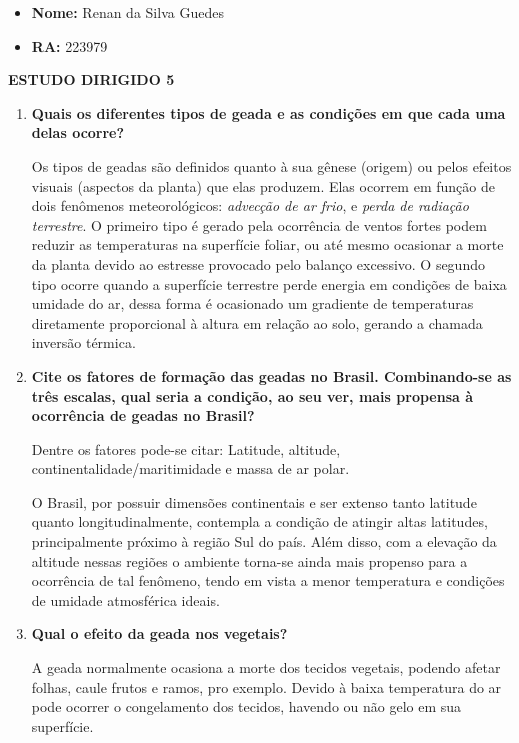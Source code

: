 \documentclass[a4paper, 12pt]{article}
\begin{document}
	\begin{itemize}
		\item\textbf{Nome:} Renan da Silva Guedes
		\item\textbf{RA:} 223979
	\end{itemize}

	\begin{center}
		\begin{large}
			\uppercase{\textbf{Estudo Dirigido 5}}
		\end{large}
	\end{center}

	\begin{enumerate}
		\item\textbf{Quais os diferentes tipos de geada e as condições em que cada uma delas ocorre?}
		
		Os tipos de geadas são definidos quanto à sua gênese (origem) ou pelos efeitos visuais (aspectos da planta) que elas produzem. Elas ocorrem em função de dois fenômenos meteorológicos: \textit{advecção de ar frio}, e \textit{perda de radiação terrestre}. O primeiro tipo é gerado pela ocorrência de ventos fortes podem reduzir as temperaturas na superfície foliar, ou até mesmo ocasionar a morte da planta devido ao estresse provocado pelo balanço excessivo. O segundo tipo ocorre quando a superfície terrestre perde energia em condições de baixa umidade do ar, dessa forma é ocasionado um gradiente de temperaturas diretamente proporcional à altura em relação ao solo, gerando a chamada inversão térmica.
		
		\item\textbf{Cite os fatores de formação das geadas no Brasil. Combinando-se as três escalas, qual seria a condição, ao seu ver, mais propensa à ocorrência de geadas no Brasil?}
		
		Dentre os fatores pode-se citar: Latitude, altitude, continentalidade/maritimidade e massa de ar polar. 
		
		O Brasil, por possuir dimensões continentais e ser extenso tanto latitude quanto longitudinalmente, contempla a condição de atingir altas latitudes, principalmente próximo à região Sul do país. Além disso, com a elevação da altitude nessas regiões o ambiente torna-se ainda mais propenso para a ocorrência de tal fenômeno, tendo em vista a menor temperatura e condições de umidade atmosférica ideais.
		
		\item\textbf{Qual o efeito da geada nos vegetais?}
		
		A geada normalmente ocasiona a morte dos tecidos vegetais, podendo afetar folhas, caule frutos e ramos, pro exemplo. Devido à baixa temperatura do ar pode ocorrer o congelamento dos tecidos, havendo ou não gelo em sua superfície.
		

\end{enumerate}
\end{document}
